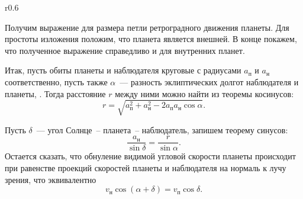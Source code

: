 \begin{wrapfigure}[12]{r}{0.6\tw}
    \caption{}
    \label{pic:retrograde-movement-schema}
\end{wrapfigure}

Получим выражение для размера петли ретроградного движения планеты. Для простоты изложения положим, что планета является внешней. В конце покажем, что полученное выражение справедливо и для внутренних планет. 

Итак, пусть обиты планеты и наблюдателя круговые с радиусами $a_\text{п}$ и  $a_\text{н}$ соответственно, пусть также $\alpha$~--- разность эклиптических долгот наблюдателя и планеты, . Тогда расстояние $r$ между ними можно найти из теоремы косинусов:
\begin{equation}
    r = \sqrt{a_\text{п}^2 + a_\text{н}^2 - 2 a_\text{п} a_\text{н} \cos \alpha}.
    \label{eq:retrograde-movement-distance}
\end{equation}

Пусть $\delta$~--- угол Солнце~-- планета~-- наблюдатель, запишем теорему синусов:
\begin{equation}
    \frac{a_\text{н}}{\sin \delta} = \frac{r}{\sin \alpha}.
    \label{eq:retrograde-movement-sinuses-theorem}
\end{equation}
Остается сказать, что обнуление видимой угловой скорости планеты происходит при равенстве проекций скоростей планеты и наблюдателя на нормаль к лучу зрения, что эквивалентно
\begin{equation}
    v_\text{н} \cos (\alpha + \delta) = v_\text{п} \cos \delta.
    \label{eq:retrograde-movement-velocity-projectione-equivalence}
\end{equation}

